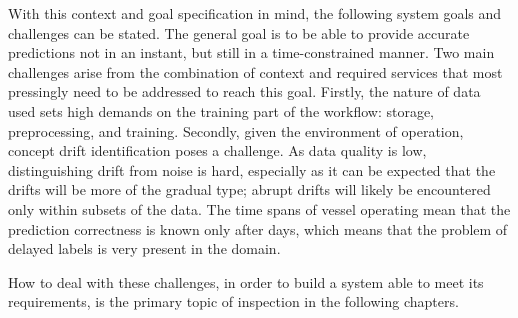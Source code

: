 With this context and goal specification in mind, the following system goals and challenges can be stated. The general goal is to be able to provide accurate predictions not in an instant, but still in a time-constrained manner. Two main challenges arise from the combination of context and required services that most pressingly need to be addressed to reach this goal. Firstly, the nature of data used sets high demands on the training part of the workflow: storage, preprocessing, and training. Secondly, given the environment of operation, concept drift identification poses a challenge. As data quality is low, distinguishing drift from noise is hard, especially as it can be expected that the drifts will be more of the gradual type; abrupt drifts will likely be encountered only within subsets of the data. The time spans of vessel operating mean that the prediction correctness is known only after days, which means that the problem of delayed labels is very present in the domain.

How to deal with these challenges, in order to build a system able to meet its requirements, is the primary topic of inspection in the following chapters.







